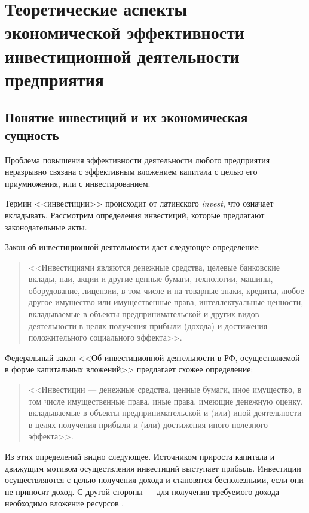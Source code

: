 \section{Теоретические аспекты экономической эффективности инвестиционной деятельности предприятия}
\subsection{Понятие инвестиций и их экономическая сущность}
Проблема повышения эффективности деятельности любого предприятия неразрывно связана с эффективным вложением капитала с целью его приумножения, или с инвестированием.

Термин <<инвестиции>> происходит от латинского \textit{invest}, что означает вкладывать. Рассмотрим определения инвестиций, которые предлагают законодательные акты.

Закон об инвестиционной деятельности \cite{1488} дает следующее определение:
\begin{quote}
	<<Инвестициями являются денежные средства, целевые банковские вклады, паи, акции и другие ценные бумаги, технологии, машины, оборудование, лицензии, в том числе и на товарные знаки, кредиты, любое другое имущество или имущественные права, интеллектуальные ценности, вкладываемые в объекты предпринимательской и других видов деятельности в целях получения прибыли (дохода) и достижения положительного социального эффекта>>.
\end{quote}

Федеральный закон <<Об инвестиционной деятельности в РФ, осуществляемой в форме капитальных вложений>> \cite{39-fz} предлагает схожее определение:
\begin{quote}
	<<Инвестиции --- денежные средства, ценные бумаги, иное имущество, в том числе имущественные права, иные права, имеющие денежную оценку, вкладываемые в объекты предпринимательской и (или) иной деятельности в целях получения прибыли и (или) достижения иного полезного эффекта>>.
\end{quote}

Из этих определений видно следующее. Источником прироста капитала и движущим мотивом осуществления инвестиций выступает прибыль. Инвестиции осуществляются с целью получения дохода и становятся бесполезными, если они не приносят доход. С другой стороны --- для получения требуемого дохода необходимо вложение ресурсов \cite[с. 13]{kasyanenko}.

